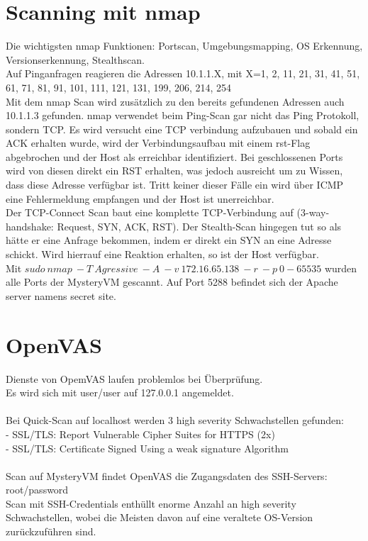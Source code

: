 \documentclass[12pt]{article}
\theoremstyle{plain}
\begin{document}
\section{Scanning mit nmap}
Die wichtigsten nmap Funktionen: Portscan, Umgebungsmapping, OS Erkennung, Versionserkennung, Stealthscan.\\
Auf Pinganfragen reagieren die Adressen 10.1.1.X, mit X=1, 2, 11, 21, 31, 41, 51, 61, 71, 81, 91, 101, 111, 121, 131, 199, 206, 214, 254\\
Mit dem nmap Scan wird zusätzlich zu den bereits gefundenen Adressen auch 10.1.1.3 gefunden. nmap verwendet beim Ping-Scan gar nicht das Ping Protokoll, sondern TCP. Es wird versucht eine TCP verbindung aufzubauen und sobald ein ACK erhalten wurde, wird der Verbindungsaufbau mit einem rst-Flag abgebrochen und der Host als erreichbar identifiziert. Bei geschlossenen Ports wird von diesen direkt ein RST erhalten, was jedoch ausreicht um zu Wissen, dass diese Adresse verfügbar ist. Tritt keiner dieser Fälle ein wird über ICMP eine Fehlermeldung empfangen und der Host ist unerreichbar.\\
Der TCP-Connect Scan baut eine komplette TCP-Verbindung auf (3-way-handshake: Request, SYN, ACK, RST). Der Stealth-Scan hingegen tut so als hätte er eine Anfrage bekommen, indem er direkt ein SYN an eine Adresse schickt. Wird hierrauf eine Reaktion erhalten, so ist der Host verfügbar.\\
Mit $sudo\ nmap\ -T\ Agressive\ -A\ -v\ 172.16.65.138\ -r\ -p\ 0-65535$ wurden alle Ports der MysteryVM gescannt. Auf Port 5288 befindet sich der Apache server namens secret site.
\section{OpenVAS}
Dienste von OpemVAS laufen problemlos bei Überprüfung. \\
Es wird sich mit user/user auf 127.0.0.1 angemeldet. \\ \\
Bei Quick-Scan auf localhost werden 3 high severity Schwachstellen gefunden:\\
- SSL/TLS: Report Vulnerable Cipher Suites for HTTPS (2x)\\
- SSL/TLS: Certificate Signed Using a weak signature Algorithm\\\\
Scan auf MysteryVM findet OpenVAS die Zugangsdaten des SSH-Servers: root/password\\
Scan mit SSH-Credentials enthüllt enorme Anzahl an high severity Schwachstellen, wobei die Meisten davon auf eine veraltete OS-Version zurückzuführen sind.
\newline
\end{document}
